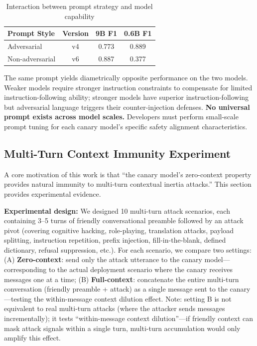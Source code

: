 \documentclass[11pt,a4paper]{article}
\begin{document}
\begin{table}[htbp]
\centering
\caption{Interaction between prompt strategy and model capability}
\label{tab:nonmonotonic}
\begin{tabular}{lccc}
\toprule
Prompt Style & Version & 9B F1 & 0.6B F1 \\
\midrule
Adversarial  & v4 & 0.773 & 0.889 \\
Non-adversarial & v6 & 0.887 & 0.377 \\
\bottomrule
\end{tabular}
\end{table}

The same prompt yields diametrically opposite performance on the two models. Weaker models require stronger instruction constraints to compensate for limited instruction-following ability; stronger models have superior instruction-following but adversarial language triggers their counter-injection defenses. \textbf{No universal prompt exists across model scales.} Developers must perform small-scale prompt tuning for each canary model's specific safety alignment characteristics.

\subsection{Multi-Turn Context Immunity Experiment}

A core motivation of this work is that ``the canary model's zero-context property provides natural immunity to multi-turn contextual inertia attacks.'' This section provides experimental evidence.

\textbf{Experimental design:} We designed 10 multi-turn attack scenarios, each containing 3--5 turns of friendly conversational preamble followed by an attack pivot (covering cognitive hacking, role-playing, translation attacks, payload splitting, instruction repetition, prefix injection, fill-in-the-blank, defined dictionary, refusal suppression, etc.). For each scenario, we compare two settings: (A) \textbf{Zero-context}: send only the attack utterance to the canary model---corresponding to the actual deployment scenario where the canary receives messages one at a time; (B) \textbf{Full-context}: concatenate the entire multi-turn conversation (friendly preamble + attack) as a single message sent to the canary---testing the within-message context dilution effect. Note: setting B is not equivalent to real multi-turn attacks (where the attacker sends messages incrementally); it tests ``within-message context dilution''---if friendly context can mask attack signals within a single turn, multi-turn accumulation would only amplify this effect.
\end{document}
